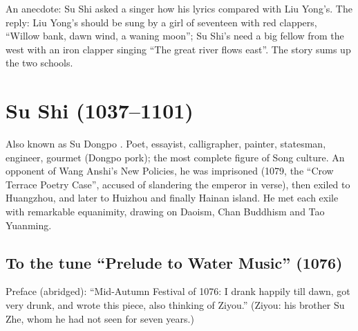 \begin{aside}
An anecdote: Su Shi asked a singer how his lyrics compared with Liu Yong's. The reply:
Liu Yong's should be sung by a girl of seventeen with red clappers, ``Willow bank, dawn
wind, a waning moon''; Su Shi's need a big fellow from the west with an iron clapper
singing ``The great river flows east''. The story sums up the two schools.
\end{aside}

\section{Su Shi  (1037--1101)}

Also known as Su Dongpo . Poet, essayist, calligrapher, painter, statesman,
engineer, gourmet (Dongpo pork); the most complete figure of Song culture. An opponent of
Wang Anshi's New Policies, he was imprisoned (1079, the ``Crow Terrace Poetry Case'',
accused of slandering the emperor in verse), then exiled to Huangzhou, and later to Huizhou
and finally Hainan island. He met each exile with remarkable equanimity, drawing on Daoism,
Chan Buddhism and Tao Yuanming.

\subsection{To the tune ``Prelude to Water Music''  (1076)}

Preface (abridged): ``Mid-Autumn Festival of 1076: I drank happily till dawn, got very
drunk, and wrote this piece, also thinking of Ziyou.'' (Ziyou: his brother Su Zhe, whom he
had not seen for seven years.)

